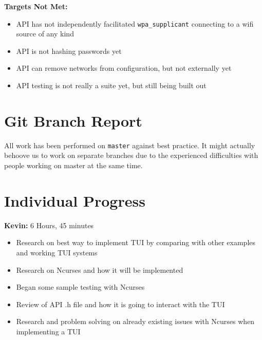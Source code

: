 \documentclass[11pt]{article}
\begin{document}
\textbf{Targets Not Met:}
\begin{itemize}
  \item API has not independently facilitated \texttt{wpa\_supplicant} connecting to a wifi source of any kind
  \item API is not hashing passwords yet
  \item API can remove networks from configuration, but not externally yet
  \item API testing is not really a suite yet, but still being built out
\end{itemize}


\section{Git Branch Report}
All work has been performed on \texttt{master} against best practice. It might actually behoove us to
work on separate branches due to the experienced difficulties with people working on master at the same
time.


\section{Individual Progress}

\textbf{Kevin:} 6 Hours, 45 minutes
\begin{itemize}
  \item Research on best way to implement TUI by comparing with other examples and working TUI systems
  \item Research on Ncurses and how it will be implemented 
  \item Began some sample testing with Ncurses 
  \item Review of API .h file and how it is going to interact with the TUI
  \item Research and problem solving on already existing issues with Ncurses when implementing a TUI
\end{itemize}
\end{document}
